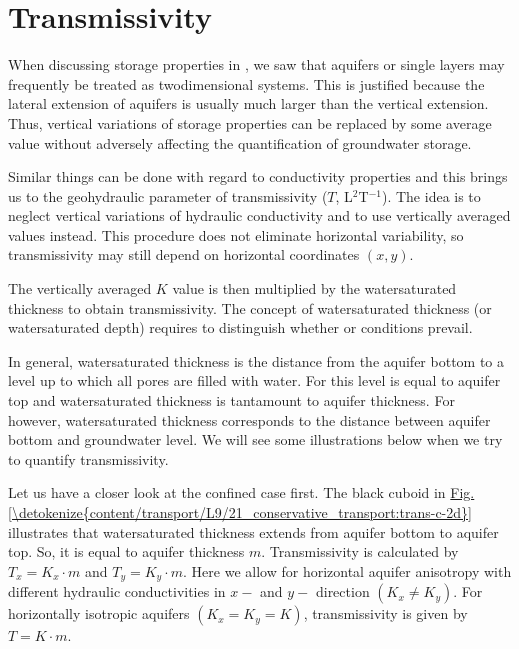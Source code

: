 \documentclass[letterpaper,10pt,english]{jupyterBook}
\begin{document}
\section{Transmissivity}
\label{\detokenize{content/flow/L8/18_wells:transmissivity}}
\sphinxAtStartPar
When discussing storage properties in {\hyperref[\detokenize{content/flow/L3/13_gw_storage::doc}]{}}, we saw that aquifers or single layers may frequently be treated as two\sphinxhyphen{}dimensional systems. This is justified because the lateral extension of aquifers is usually much larger than the vertical extension. Thus, vertical variations of storage properties can be replaced by some average value without adversely affecting the quantification of groundwater storage.

\sphinxAtStartPar
Similar things can be done with regard to conductivity properties and this brings us to the geohydraulic parameter of transmissivity (\(T\),  L\(^2\)T\(^{-1}\)). The idea is to neglect vertical variations of hydraulic conductivity and to use vertically averaged values instead. This procedure does not eliminate horizontal variability, so transmissivity may still depend on horizontal coordinates  \((x, y)\).

\sphinxAtStartPar
The vertically averaged \(K\) value is then multiplied by the water\sphinxhyphen{}saturated thickness to obtain transmissivity. The concept of water\sphinxhyphen{}saturated thickness (or water\sphinxhyphen{}saturated depth) requires to distinguish whether  or  conditions prevail.

\sphinxAtStartPar
In general, water\sphinxhyphen{}saturated thickness is the distance from the aquifer bottom to a level up to which all pores are filled with water. For  this level is equal to aquifer top and water\sphinxhyphen{}saturated thickness is tantamount to aquifer thickness. For  however, water\sphinxhyphen{}saturated thickness corresponds to the distance between aquifer bottom and groundwater level. We will see some illustrations below when we try to quantify transmissivity.

\sphinxAtStartPar
Let us have a closer look at the confined case first. The black cuboid in \hyperref[\detokenize{content/transport/L9/21_conservative_transport:trans-c-2d}]{Fig.\@ \ref{\detokenize{content/transport/L9/21_conservative_transport:trans-c-2d}}}  illustrates that water\sphinxhyphen{}saturated thickness extends from aquifer bottom to aquifer top. So, it is equal to aquifer thickness \(m\). Transmissivity is calculated by \(T_x = K_x \cdot m\) and \(T_y = K_y \cdot m\). Here we allow for horizontal aquifer anisotropy with different hydraulic conductivities in \(x-\) and \(y-\) direction \((K_x\neq K_y)\). For horizontally isotropic aquifers \((K_x = K_y = K)\), transmissivity is given by \(T = K \cdot m\).
\end{document}
